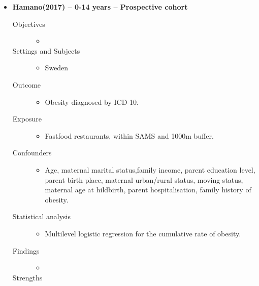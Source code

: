 \documentclass{article}
\begin{document}
\begin{itemize}
\item{\bf Hamano(2017) -- 0-14 years  -- Prospective cohort} 
		\begin{description}
			\item[Objectives] \mbox{}\par
				\begin{itemize}
					\item
				\end{itemize}
			\item[Settings and Subjects] \mbox{}\par
				\begin{itemize}
					\item Sweden
				\end{itemize}
			\item[Outcome] \mbox{}\par
				\begin{itemize}
					\item Obesity diagnosed by ICD-10. 
				\end{itemize}
			\item[Exposure] \mbox{}\par
				\begin{itemize}
					\item Fastfood restaurants, within SAMS and 1000m buffer.
				\end{itemize}
			\item[Confounders] \mbox{}\par
				\begin{itemize}
					\item Age, maternal marital status,family income, parent education level, parent birth place, maternal urban/rural status, moving status, maternal age at hildbirth, parent hospitalisation, family history of obesity. 
				\end{itemize}
			\item[Statistical analysis] \mbox{}\par
				\begin{itemize}
					\item Multilevel logistic regression for the cumulative rate of obesity. 
				\end{itemize}
			\item[Findings]\mbox{}\par
				\begin{itemize}
					\item 
				\end{itemize}
			\item[Strengths]\mbox{}\par

\end{description}
\end{itemize}
\end{document}
